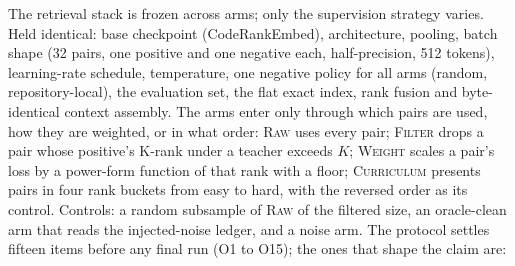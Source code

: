 \documentclass[10pt,twocolumn]{article}
\makeatletter
\renewcommand\subsection{\@startsection{subsection}{2}{\z@}{4pt}{2pt}{\normalfont\normalsize\bfseries}}
\makeatother
\begin{document}
\subsection{Protocol}

The retrieval stack is frozen across arms; only the supervision strategy varies. Held identical:
base checkpoint (CodeRankEmbed), architecture, pooling, batch shape (32 pairs, one positive and one
negative each, half-precision, 512 tokens), learning-rate schedule, temperature, one negative policy for all
arms (random, repository-local), the evaluation set, the flat exact index, rank fusion and byte-identical
context assembly. %
The arms enter only through which pairs are used, how they are weighted, or in what order:
\textsc{Raw} uses every pair; \textsc{Filter} drops a pair whose positive's K-rank under a teacher exceeds $K$;
\textsc{Weight} scales a pair's loss by a power-form function of that rank with a floor;
\textsc{Curriculum} presents pairs in four rank buckets from easy to hard, with the reversed order as its
control. Controls: a random subsample of \textsc{Raw} of the filtered size, an
oracle-clean arm that reads the injected-noise ledger, and a noise arm. %
The protocol settles fifteen items before any
final run (O1 to O15); the ones that shape the claim are:
\end{document}
